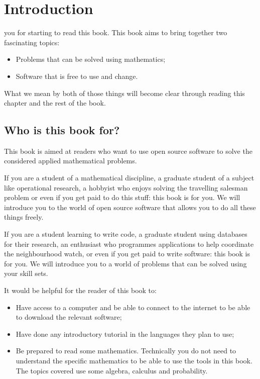 \chapter[Introduction]{Introduction}

 you for starting to read this book. This book aims to
bring together two fascinating topics:

\begin{itemize}
\item
  Problems that can be solved using mathematics;
\item
  Software that is free to use and change.
\end{itemize}

What we mean by both of those things will become clear through reading
this chapter and the rest of the book.

\section{Who is this book for?}\label{sec:who-is-this-book-for}

This book is aimed at readers who want to use open source software to solve the
considered applied mathematical problems.

If you are a student of a mathematical discipline, a graduate student of
a subject like operational research, a hobbyist who enjoys solving the
travelling salesman problem or even if you get paid to do this stuff:
this book is for you. We will introduce you to the world of open source
software that allows you to do all these things freely.

If you are a student learning to write code, a graduate student using
databases for their research, an enthusiast who programmes applications
to help coordinate the neighbourhood watch, or even if you get paid to
write software: this book is for you. We will introduce you to a world
of problems that can be solved using your skill sets.

It would be helpful for the reader of this book to:

\begin{itemize}
\item
  Have access to a computer and be able to connect to the internet
  to be able to download the relevant software;
\item
  Have done any introductory tutorial in the languages they plan to use;
\item
  Be prepared to read some mathematics. Technically you do not need to
  understand the specific mathematics to be able to use the tools in this book.
  The topics covered use some algebra, calculus and probability.
\end{itemize}

